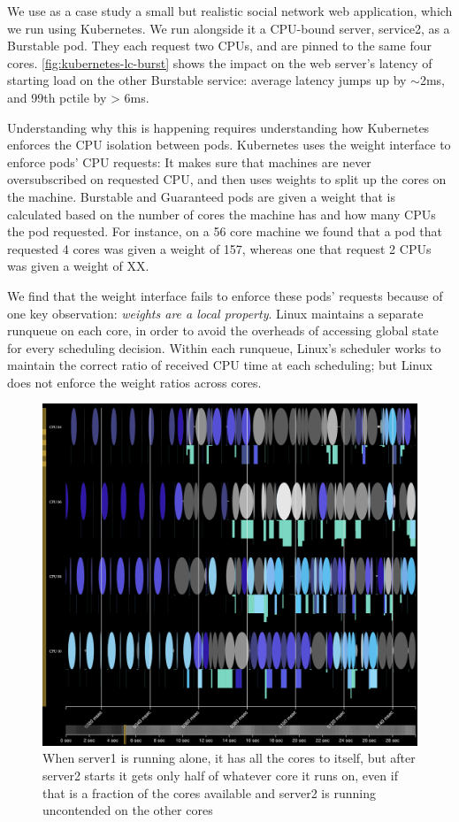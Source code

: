 We use as a case study a small but realistic social network web application,
which we run using Kubernetes. We run alongside it a CPU-bound server, service2,
as a Burstable pod. They each request two CPUs, and are pinned to the same four
cores. \autoref{fig:kubernetes-lc-burst} shows the impact on the web server's
latency of starting load on the other Burstable service: average latency jumps
up by $\sim$2ms, and 99th pctile by > 6ms.

Understanding why this is happening requires understanding how Kubernetes
enforces the CPU isolation between pods. Kubernetes uses the \cgroups{} weight
interface to enforce pods' CPU requests: It makes sure that machines are never
oversubscribed on requested CPU, and then uses weights to split up the cores on
the machine. Burstable and Guaranteed pods are given a weight that is calculated
based on the number of cores the machine has and how many CPUs the pod
requested. For instance, on a 56 core machine we found that a pod that requested
4 cores was given a weight of 157, whereas one that request 2 CPUs was given a
weight of XX.

We find that the weight interface fails to enforce these pods' requests because
of one key observation: \textit{weights are a local property}. Linux maintains a
separate runqueue on each core, in order to avoid the overheads of accessing
global state for every scheduling decision. Within each runqueue, Linux's
scheduler works to maintain the correct ratio of received CPU time at each
scheduling; but Linux does not enforce the weight ratios across cores.

\begin{figure}[t]
    \centering
    \includegraphics[width=\columnwidth]{graphs/schedviz-lc-burst-problem.png}
    \caption{When server1 is running alone, it has all the cores to itself, but
    after server2 starts it gets only half of whatever core it runs on, even if
    that is a fraction of the cores available and server2 is running uncontended
    on the other cores}\label{fig:schedviz-lc-burst-problem}
\end{figure}


